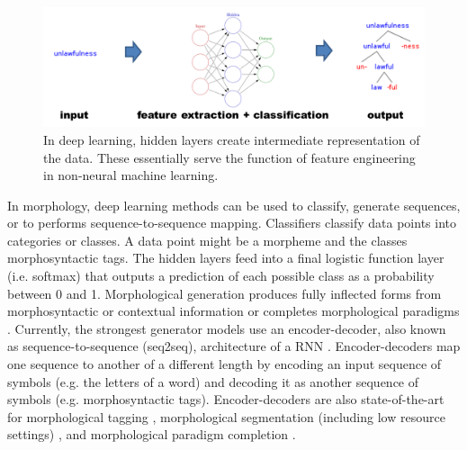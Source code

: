\documentclass[12pt]{article}
\begin{document}
\begin{figure}[ht]
\label{fig:DL}
\begin{center}
\includegraphics[width=0.95\columnwidth]{DL.PNG}
\caption{In deep learning, hidden layers create intermediate representation of the data. These essentially serve the function of feature engineering in non-neural machine learning.}
\end{center}
\end{figure}

In morphology, deep learning methods can be used to classify, generate sequences, or to performs sequence-to-sequence mapping. Classifiers classify data points into categories or classes. A data point might be a morpheme and the classes morphosyntactic tags. 
The hidden layers feed into a final logistic function layer (i.e. softmax) that outputs a prediction of each possible class as a probability between 0 and 1. Morphological generation produces fully inflected forms from morphosyntactic or contextual information \cite{cotterell_conll-sigmorphon_2017} or completes morphological paradigms \cite{malouf_generating_2016}. Currently, the strongest generator models use an encoder-decoder, also known as sequence-to-sequence (seq2seq), architecture of a RNN \cite{sutskever2014,kann_neural_2016}. Encoder-decoders map one sequence to another of a different length by encoding an input sequence of symbols (e.g. the letters of a word) and decoding it as another sequence of symbols (e.g. morphosyntactic tags). Encoder-decoders are also state-of-the-art for morphological tagging \cite{heigold_extensive_2017}, morphological segmentation (including low resource settings) \cite{kann_fortification_2018}, and morphological paradigm completion \cite{cotterell_conllsigmorphon_2018}. 
\end{document}
